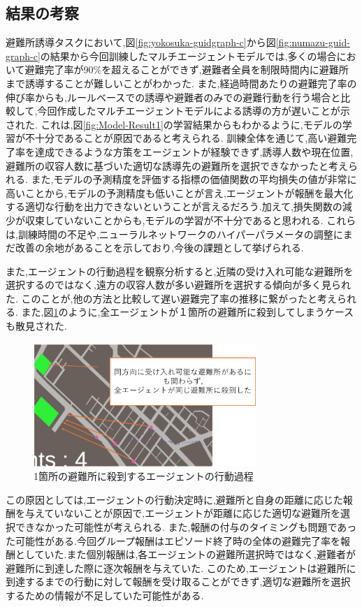 \subsection{結果の考察}
避難所誘導タスクにおいて,図\ref{fig:yokosuka-guidgraph-c}から図\ref{fig:numazu-guid-graph-c}の結果から今回訓練したマルチエージェントモデルでは,多くの場合において避難完了率が90\%を超えることができず,避難者全員を制限時間内に避難所まで誘導することが難しいことがわかった.
また,経過時間あたりの避難完了率の伸び率からも,ルールベースでの誘導や避難者のみでの避難行動を行う場合と比較して,今回作成したマルチエージェントモデルによる誘導の方が遅いことが示された.
これは,図\ref{fig:Model-Result1}の学習結果からもわかるように,モデルの学習が不十分であることが原因であると考えられる.
訓練全体を通じて,高い避難完了率を達成できるような方策をエージェントが経験できず,誘導人数や現在位置,避難所の収容人数に基づいた適切な誘導先の避難所を選択できなかったと考えられる.
また,モデルの予測精度を評価する指標の価値関数の平均損失の値が非常に高いことから,モデルの予測精度も低いことが言え,エージェントが報酬を最大化する適切な行動を出力できないということが言えるだろう.加えて,損失関数の減少が収束していないことからも,モデルの学習が不十分であると思われる.
これらは,訓練時間の不足や,ニューラルネットワークのハイパーパラメータの調整にまだ改善の余地があることを示しており,今後の課題として挙げられる.

また,エージェントの行動過程を観察分析すると,近隣の受け入れ可能な避難所を選択するのではなく,遠方の収容人数が多い避難所を選択する傾向が多く見られた.
このことが,他の方法と比較して遅い避難完了率の推移に繋がったと考えられる.
また,図\ref{fig:GuidAgent-Tink1}のように,全エージェントが１箇所の避難所に殺到してしまうケースも散見された.
\begin{figure}[H] 
  \centering 
  \includegraphics[width=0.75\textwidth]{Figures/GuidAgent-Tink1.png}
  \caption{1箇所の避難所に殺到するエージェントの行動過程}
  \label{fig:GuidAgent-Tink1}
\end{figure}
この原因としては,エージェントの行動決定時に,避難所と自身の距離に応じた報酬を与えていないことが原因で,エージェントが距離に応じた適切な避難所を選択できなかった可能性が考えられる.
また,報酬の付与のタイミングも問題であった可能性がある.今回グループ報酬はエピソード終了時の全体の避難完了率を報酬としていた.また個別報酬は,各エージェントの避難所選択時ではなく,避難者が避難所に到達した際に逐次報酬を与えていた.
このため,エージェントは避難所に到達するまでの行動に対して報酬を受け取ることができず,適切な避難所を選択するための情報が不足していた可能性がある.

